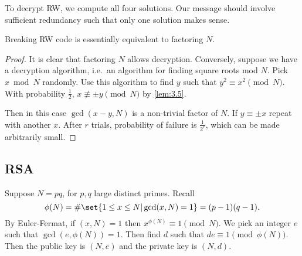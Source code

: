 \documentclass{article}
\newcommand{\1}[1]{\mathbbm{1}_{#1}}
\begin{document}
To decrypt RW, we compute all four solutions. Our message should involve sufficient redundancy such that only one solution makes sense.
\begin{nthm}\label{thm:3.6}
    Breaking RW code is essentially equivalent to factoring $N$.
\end{nthm}
\begin{proof}
    It is clear that factoring $N$ allows decryption.
    Conversely, suppose we have a decryption algorithm, i.e.\ an algorithm for finding square roots mod $N$.
    Pick $x \bmod{N}$ randomly.
    Use this algorithm to find $y$ such that $y^2 \equiv x^2 \pmod{N}$.
    With probability $\frac{1}{2}$, $x \not\equiv \pm y \pmod{N}$ by \cref{lem:3.5}.

    Then in this case $\gcd(x-y, N)$ is a non-trivial factor of $N$. If $y \equiv \pm x$ repeat with another $x$.
    After $r$ trials, probability of failure is $\frac{1}{2^r}$, which can be made arbitrarily small.
\end{proof}

\subsection{RSA}
Suppose $N = pq$, for $p,q$ large distinct primes. Recall
\begin{equation*}
    \phi(N) = \#\set{1 \leq x \leq N | \gcd(x, N) = 1} = (p-1)(q-1).
\end{equation*}
By Euler-Fermat, if $(x, N) = 1$ then $x^{\phi(N)} \equiv 1 \pmod{N}$.
We pick an integer $e$ such that $\gcd(e, \phi(N)) = 1$. Then find $d$ such that $de \equiv 1 \pmod{\phi(N)}$.
Then the public key is $(N, e)$ and the private key is $(N, d)$.
\end{document}
